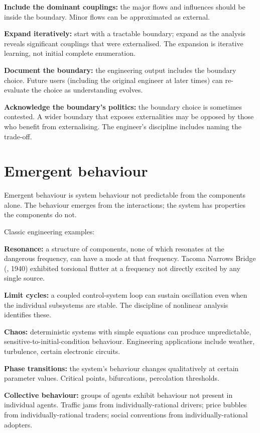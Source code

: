 \textbf{Include the dominant couplings:} the major flows and influences should be inside the boundary. Minor flows can be approximated as external.

\textbf{Expand iteratively:} start with a tractable boundary; expand as the analysis reveals significant couplings that were externalised. The expansion is iterative learning, not initial complete enumeration.

\textbf{Document the boundary:} the engineering output includes the boundary choice. Future users (including the original engineer at later times) can re-evaluate the choice as understanding evolves.

\textbf{Acknowledge the boundary's politics:} the boundary choice is sometimes contested. A wider boundary that exposes externalities may be opposed by those who benefit from externalising. The engineer's discipline includes naming the trade-off.

\section{Emergent behaviour}

Emergent behaviour is system behaviour not predictable from the components alone. The behaviour emerges from the interactions; the system has properties the components do not.

Classic engineering examples:

\textbf{Resonance:} a structure of components, none of which resonates at the dangerous frequency, can have a mode at that frequency. Tacoma Narrows Bridge (\cite{acc:tacoma-narrows-1941}, 1940) exhibited torsional flutter at a frequency not directly excited by any single source.

\textbf{Limit cycles:} a coupled control-system loop can sustain oscillation even when the individual subsystems are stable. The discipline of nonlinear analysis identifies these.

\textbf{Chaos:} deterministic systems with simple equations can produce unpredictable, sensitive-to-initial-condition behaviour. Engineering applications include weather, turbulence, certain electronic circuits.

\textbf{Phase transitions:} the system's behaviour changes qualitatively at certain parameter values. Critical points, bifurcations, percolation thresholds.

\textbf{Collective behaviour:} groups of agents exhibit behaviour not present in individual agents. Traffic jams from individually-rational drivers; price bubbles from individually-rational traders; social conventions from individually-rational adopters.

